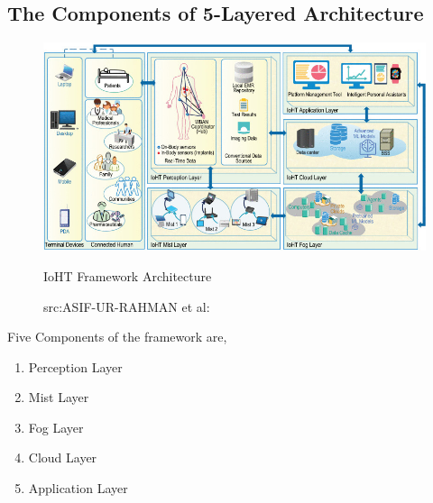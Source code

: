 \subsection{The Components of 5-Layered Architecture}

\graphicspath{{C:/Users/LIKITHA/semitex/chapters}}
\begin{figure}[H]
	\centering
	\includegraphics[width=\linewidth]{image/architecture.jpg}
	\caption{IoHT Framework Architecture}
		\caption*{src:ASIF-UR-RAHMAN et al:\cite{3}}
\end{figure}

Five Components of the framework are,\\
\begin{enumerate}
	\item Perception Layer
	\item Mist Layer
	\item Fog Layer
	\item Cloud Layer
	\item Application Layer\cite{3} 
\end{enumerate}


